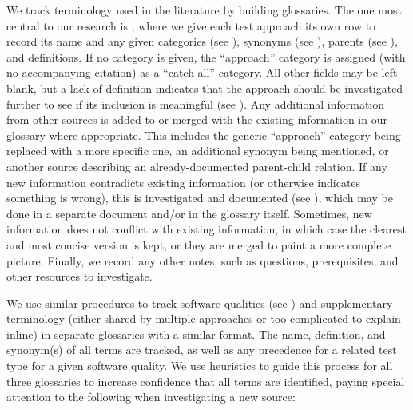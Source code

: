 We track terminology used in the literature by building glossaries. The one
most central to our research is \ourApproachGlossary{}, where we give each
test approach its own row to
record its name and any given categories (see ),
synonyms (see ), parents (see ), and
definitions. If no category is given, the ``approach'' category is assigned
(with no accompanying citation) as a ``catch-all'' category. All other fields
may be left blank, but a lack of definition indicates that the approach should
be investigated further to see if its inclusion is meaningful (see
). Any additional information from other sources is added to
or merged with the existing information in our glossary where appropriate.
This includes the generic ``approach'' category being replaced with a more
specific one, an additional synonym being mentioned, or another source
describing an already-documented parent-child relation. If any new information
contradicts existing information (or otherwise indicates something is wrong),
this is investigated and documented (see ), which may be done
in a separate document and/or in the glossary itself. Sometimes, new
information does not conflict with existing information, in which case the
clearest and most concise version is kept, or they are merged to paint a more
complete picture. Finally, we record any other notes, such as questions,
prerequisites, and other resources to investigate.

We use similar procedures to track software qualities \ifnotpaper (see
    ) \fi and supplementary terminology (either shared by
multiple approaches or too complicated to explain inline) in separate
glossaries with a similar format. The name, definition, and synonym(s) of all
terms are tracked, as well as any precedence for a related test type for a
given software quality. We use heuristics to guide this process for all three
glossaries to increase confidence that all terms are identified, paying
special attention to the following when investigating a new source:

